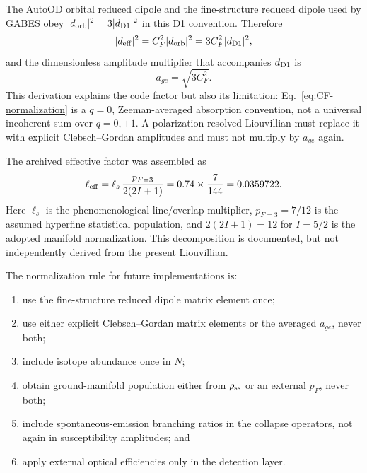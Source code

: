 \documentclass[11pt,a4paper]{article}
\begin{document}
The AutoOD orbital reduced dipole and the fine-structure reduced dipole used
by GABES obey $|d_{\rm orb}|^2=3|d_{\rm D1}|^2$ in this D1 convention.
Therefore
\[
|d_{\rm eff}|^2=C_F^2|d_{\rm orb}|^2
=3C_F^2|d_{\rm D1}|^2,
\]
and the dimensionless amplitude multiplier that accompanies
$d_{\rm D1}$ is
\begin{equation}
a_{ge}=\sqrt{3C_F^2}.
\label{eq:age-normalization}
\end{equation}
This derivation explains the code factor but also its limitation:
Eq.~\eqref{eq:CF-normalization} is a $q=0$, Zeeman-averaged absorption
convention, not a universal incoherent sum over $q=0,\pm1$. A
polarization-resolved Liouvillian must replace it with explicit
Clebsch--Gordan amplitudes and must not multiply by $a_{ge}$ again.

The archived effective factor was assembled as
\begin{equation}
\ell_{\rm eff}
=\ell_s\,\frac{p_{F=3}}{2(2I+1)}
=0.74\times\frac{7}{144}
=0.0359722 .
\label{eq:ell-effective}
\end{equation}
Here $\ell_s$ is the phenomenological line/overlap multiplier,
$p_{F=3}=7/12$ is the assumed hyperfine statistical population, and
$2(2I+1)=12$ for $I=5/2$ is the adopted manifold normalization. This
decomposition is documented, but not independently derived from the present
Liouvillian.

The normalization rule for future implementations is:
\begin{enumerate}
\item use the fine-structure reduced dipole matrix element once;
\item use either explicit Clebsch--Gordan matrix elements or the averaged
$a_{ge}$, never both;
\item include isotope abundance once in $N$;
\item obtain ground-manifold population either from $\rho_{\rm ss}$ or an
external $p_F$, never both;
\item include spontaneous-emission branching ratios in the collapse
operators, not again in susceptibility amplitudes; and
\item apply external optical efficiencies only in the detection layer.
\end{enumerate}
\end{document}
